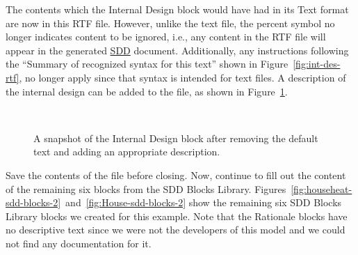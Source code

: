 \documentclass{mcscert}
\newcommand{\sddblks}{SDD Blocks Library}
\begin{document}
The contents which the Internal Design block would have had in its Text format are now in this RTF file. 
However, unlike the text file, the percent symbol no longer indicates content to be ignored, i.e., any content in the RTF file will appear in the generated \hyperref[acr:sdd]{SDD} document. 
Additionally, any instructions following the ``Summary of recognized syntax for this text'' shown in Figure~\ref{fig:int-des-rtf}, no longer apply since that syntax is intended for text files. 
A description of the internal design can be added to the file, as shown in Figure~\ref{fig:int-des-rtf-2}.

\begin{figure}
	\caption{A snapshot of the Internal Design block after removing the default
	text and adding an appropriate description.}
	\centering
	\label{fig:int-des-rtf-2}
	\\
\end{figure}

Save the contents of the file before closing. 
Now, continue to fill out the content of the remaining six blocks from the \sddblks{}. 
Figures~\ref{fig:househeat-sdd-blocks-2}~and~\ref{fig:House-sdd-blocks-2} show the remaining six \sddblks{} blocks we created for this example. 
Note that the Rationale blocks have no descriptive text since we were not the developers of this model and we could not find any documentation for it.
\end{document}
